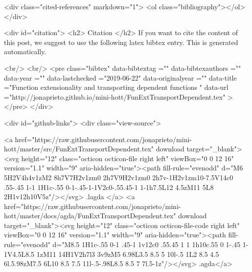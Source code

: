   <div class="cited-references" markdown="1">
  <ol class="bibliography"></ol>
  </div>


  
  <div id="citation">
  <h2> Citation </h2>
  If you want to cite the content of this post,
  we suggest to use the following latex bibtex entry.
  This is generated automatically.

  <br/>
  <br/>
  <pre class="bibtex"
       data-bibtextag =""
       data-bibtexauthors =""
       data-year =""
       data-lastchecked ="2019-06-22"
       data-originalyear =""
       data-title ="Function extensionality and transporting dependent functions "
       data-url ="http://jonaprieto.github.io/mini-hott/FunExtTransportDependent.tex"
  ></pre>
  </div>
  

  <div id="github-links">
    <div class="view-source">
      
        <a href="https://raw.githubusercontent.com/jonaprieto/mini-hott/master/src/FunExtTransportDependent.tex" download target="_blank"><svg height="12" class="octicon octicon-file right left" viewBox="0 0 12 16" version="1.1" width="9" aria-hidden="true"><path fill-rule="evenodd" d="M6 5H2V4h4v1zM2 8h7V7H2v1zm0 2h7V9H2v1zm0 2h7v-1H2v1zm10-7.5V14c0 .55-.45 1-1 1H1c-.55 0-1-.45-1-1V2c0-.55.45-1 1-1h7.5L12 4.5zM11 5L8 2H1v12h10V5z"/></svg> .lagda </a>
        <a href="https://raw.githubusercontent.com/jonaprieto/mini-hott/master/docs/agda/FunExtTransportDependent.tex" download target="_blank"><svg height="12" class="octicon octicon-file-code right left" viewBox="0 0 12 16" version="1.1" width="9" aria-hidden="true"><path fill-rule="evenodd" d="M8.5 1H1c-.55 0-1 .45-1 1v12c0 .55.45 1 1 1h10c.55 0 1-.45 1-1V4.5L8.5 1zM11 14H1V2h7l3 3v9zM5 6.98L3.5 8.5 5 10l-.5 1L2 8.5 4.5 6l.5.98zM7.5 6L10 8.5 7.5 11l-.5-.98L8.5 8.5 7 7l.5-1z"/></svg> .agda</a>
      
